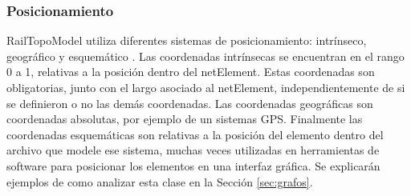 \subsubsection{Posicionamiento}

    RailTopoModel utiliza diferentes sistemas de posicionamiento: intrínseco, geográfico y esquemático \cite{Paper_112,Paper_150}. Las coordenadas intrínsecas se encuentran en el rango 0 a 1, relativas a la posición dentro del netElement. Estas coordenadas son obligatorias, junto con el largo asociado al netElement, independientemente de si se definieron o no las demás coordenadas. Las coordenadas geográficas son coordenadas absolutas, por ejemplo de un sistemas GPS. Finalmente las coordenadas esquemáticas son relativas a la posición del elemento dentro del archivo que modele ese sistema, muchas veces utilizadas en herramientas de software para posicionar los elementos en una interfaz gráfica. Se explicarán ejemplos de como analizar esta clase en la Sección \ref{sec:grafos}.
